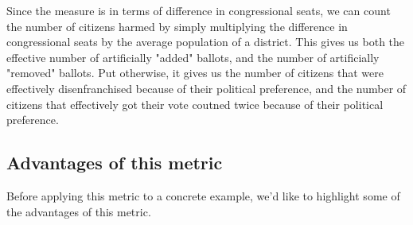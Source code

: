 \documentclass[preprint,12pt]{article}
\begin{document}
Since the measure is in terms of difference in congressional seats, we can count the number of citizens harmed by simply multiplying the difference in congressional seats by the average population of a district.  This gives us both the effective number of artificially "added" ballots, and the number of artificially "removed" ballots.  Put otherwise, it gives us the number of citizens that were effectively disenfranchised because of their political preference, and the number of citizens that effectively got their vote coutned twice because of their political preference.
  
\subsection{Advantages of this metric}
 
Before applying this metric to a concrete example, we'd like to highlight some of the advantages of this metric.
\end{document}
